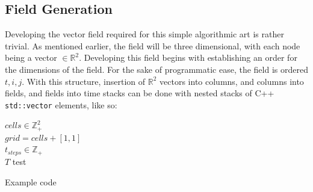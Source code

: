 \documentclass[a4paper]{article}
\begin{document}
\subsection{Field Generation}
Developing the vector field required for this simple algorithmic art is rather trivial. As mentioned earlier, the field will be three dimensional, with each node being a vector $\in \mathbb{R}^{2}$. Developing this field begins with establishing an order for the dimensions of the field. For the sake of programmatic ease, the field is ordered $t,i,j$. With this structure, insertion of $\mathbb{R}^{2}$ vectors into columns, and columns into fields, and fields into time stacks can be done with nested stacks of C++ \texttt{std::vector} elements, like so:

\begin{algorithm}[H]
  $cells \in \mathbb{Z}^{2}_{+}$\\
  $grid = cells + \left[1,1\right]$\\
  $t_{steps} \in \mathbb{Z}_{+}$\\
  $T$
  {
    {
      {
        test
      }
    }
  }

\caption{Example code}
\end{algorithm}
\end{document}

